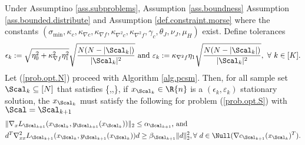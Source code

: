 %	

\begin{theorem}
Under Assumptino \ref{ass.subproblems}, Assumption \ref{ass.boundness}  Assumption \ref{ass.bounded.distribute} and Assumption \ref{def.constraint.morse} where the constants $(\sigma_{\min},\kappa_{ c},\kappa_{\nabla c},\kappa_{\nabla f},\kappa_{\nabla^2 c},\kappa_{\nabla^2 f},\gamma_c,\theta_J,\nu_J,\mu_H )$ exist.  Define tolerances 
\[
\epsilon_k:=\sqrt{\eta_0^2+\kappa_{\nabla f}^2\eta_1^2}\sqrt{\frac{N(N-|\Scal_k|)}{|\Scal_k|^2}}\text{ and }\varepsilon_k:= \kappa_{\nabla^2f}\eta_1\sqrt{\frac{N(N-|\Scal_k|)}{|\Scal_k|^2}},\ \forall\ k\in[K].
\]
Let (\ref{prob.opt.N}) proceed with Algorithm \ref{alg.pcsm}. Then, for all sample set $\Scal_k\subseteq[N]$ that satisfies
\bequation
\label{eq.theorem2.S}
\le
\min\left\{,,\right\},
\eequation
if $x_{\Scal_k}\in\R{n}$ is a $(\epsilon_k,\varepsilon_k)$ stationary solution, the $x_{\Scal_k}$ must satisfy the following for problem (\ref{prob.opt.S}) with $\Scal=\Scal_{k+1}$
\begin{align*}
	&\|\nabla_xL_{\Scal_{k+1}}(x_{\Scal_{k}},y_{\Scal_{k+1}}(x_{\Scal_k}))\|_2 \le\alpha_{\Scal_{k+1}}\text{, and }\\
	& d^T\nabla^2_{xx}L_{\Scal_{k+1}}(x_{\Scal_{k}},y_{\Scal_{k+1}}(x_{\Scal_k}))d\ge \beta_{\Scal_{k+1}}\|d\|_2^2,\forall \ d\in\Null(\nabla c_{\Scal_{k+1}}(x_{\Scal_k})^T).
\end{align*}
\end{theorem}

